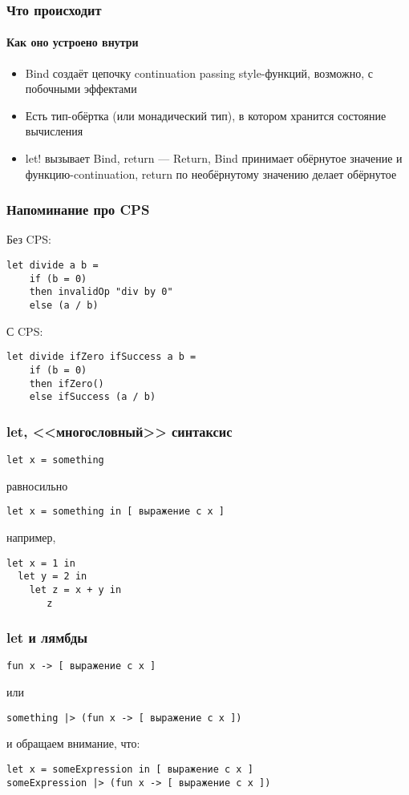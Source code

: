 \documentclass[xetex,mathserif,serif]{beamer}
\begin{document}
	\begin{frame}
		\frametitle{Что происходит}
		\framesubtitle{Как оно устроено внутри}
		\begin{itemize}
			\item Bind создаёт цепочку continuation passing style-функций, возможно, с побочными эффектами
			\item Есть тип-обёртка (или монадический тип), в котором хранится состояние вычисления
			\item let! вызывает Bind, return --- Return, Bind принимает обёрнутое значение и функцию-continuation, return по необёрнутому значению делает обёрнутое
		\end{itemize}
	\end{frame}

	\begin{frame}[fragile]
		\frametitle{Напоминание про CPS}
		Без CPS:
		\begin{verbatim}
let divide a b =
    if (b = 0) 
    then invalidOp "div by 0"
    else (a / b)
		\end{verbatim}
		\vspace{5mm}
		С CPS:
		\begin{verbatim}
let divide ifZero ifSuccess a b = 
    if (b = 0) 
    then ifZero()
    else ifSuccess (a / b)
		\end{verbatim}
\end{frame}

	\begin{frame}[fragile]
		\frametitle{let, <<многословный>> синтаксис}
		\begin{verbatim}
let x = something
		\end{verbatim}

		равносильно

		\begin{verbatim}
let x = something in [ выражение c x ]
		\end{verbatim}

		например,

		\begin{verbatim}
let x = 1 in   
  let y = 2 in 
    let z = x + y in
       z
		\end{verbatim}
\end{frame}

	\begin{frame}[fragile]
		\frametitle{let и лямбды}
		\begin{verbatim}
fun x -> [ выражение c x ]
		\end{verbatim}

		или

		\begin{verbatim}
something |> (fun x -> [ выражение c x ])
		\end{verbatim}

		и обращаем внимание, что:

		\begin{verbatim}
let x = someExpression in [ выражение c x ]
someExpression |> (fun x -> [ выражение c x ])
		\end{verbatim}
\end{frame}
\end{document}
